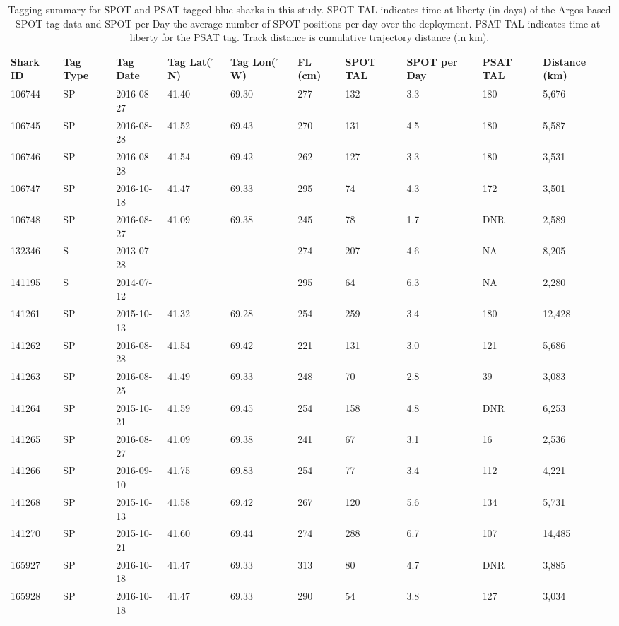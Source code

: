 \clearpage
\begin{landscape}
\begin{table}
\caption[Tagging summary for SPOT and PSAT-tagged blue sharks in this study]{Tagging summary for SPOT and PSAT-tagged blue sharks in this study. SPOT TAL indicates time-at-liberty (in days) of the Argos-based SPOT tag data and SPOT per Day the average number of SPOT positions per day over the deployment. PSAT TAL indicates time-at-liberty for the PSAT tag. Track distance is cumulative trajectory distance (in km).}
\label{tab:c5t1}
\centering
\begin{tabular}{p{1.5cm} p{.8cm} p{2cm} p{1.5cm} p{1.5cm} p{1cm} p{1cm} p{1cm} p{1cm} p{2cm}}
\toprule
Shark ID & Tag Type & Tag Date & Tag Lat($^\circ$N) & Tag Lon($^\circ$W) & FL (cm) & SPOT TAL & SPOT per Day & PSAT TAL & Distance (km)\\
\midrule
106744 & SP & 2016-08-27 & 41.40 & 69.30 & 277 & 132 & 3.3 & 180 & 5,676\\
106745 & SP & 2016-08-28 & 41.52 & 69.43 & 270 & 131 & 4.5 & 180 & 5,587\\
106746 & SP & 2016-08-28 & 41.54 & 69.42 & 262 & 127 & 3.3 & 180 & 3,531\\
106747 & SP & 2016-10-18 & 41.47 & 69.33 & 295 & 74 & 4.3 & 172 & 3,501\\
106748 & SP & 2016-08-27 & 41.09 & 69.38 & 245 & 78 & 1.7 & DNR & 2,589\\
132346 & S & 2013-07-28 &  &  & 274 & 207 & 4.6 & NA  & 8,205\\
141195 & S & 2014-07-12 &  &  & 295 & 64 & 6.3 & NA & 2,280\\
141261 & SP & 2015-10-13 & 41.32 & 69.28 & 254 & 259 & 3.4 & 180 & 12,428\\
141262 & SP & 2016-08-28 & 41.54 & 69.42 & 221 & 131 & 3.0 & 121 & 5,686\\
141263 & SP & 2016-08-25 & 41.49 & 69.33 & 248 & 70 & 2.8 & 39 & 3,083\\
141264 & SP & 2015-10-21 & 41.59 & 69.45 & 254 & 158 & 4.8 & DNR & 6,253\\
141265 & SP & 2016-08-27 & 41.09 & 69.38 & 241 & 67 & 3.1 & 16 & 2,536\\
141266 & SP & 2016-09-10 & 41.75 & 69.83 & 254 & 77 & 3.4 & 112 & 4,221\\
141268 & SP & 2015-10-13 & 41.58 & 69.42 & 267 & 120 & 5.6 & 134 & 5,731\\
141270 & SP & 2015-10-21 & 41.60 & 69.44 & 274 & 288 & 6.7 & 107 & 14,485\\
165927 & SP & 2016-10-18 & 41.47 & 69.33 & 313 & 80 & 4.7 & DNR & 3,885\\
165928 & SP & 2016-10-18 & 41.47 & 69.33 & 290 & 54 & 3.8 & 127 & 3,034\\
\bottomrule
\end{tabular}
\end{table}
\end{landscape}
\clearpage

